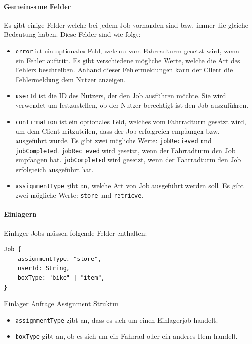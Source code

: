 \paragraph{Gemeinsame Felder}

Es gibt einige Felder welche bei jedem Job vorhanden sind bzw. immer die gleiche Bedeutung haben. Diese Felder sind wie folgt:

\begin{itemize}
  \item \texttt{error} ist ein optionales Feld, welches vom Fahrradturm gesetzt wird, wenn ein Fehler auftritt. Es gibt verschiedene mögliche Werte, welche die Art des Fehlers beschreiben. Anhand dieser Fehlermeldungen kann der Client die Fehlermeldung dem Nutzer anzeigen.
  \item \texttt{userId} ist die ID des Nutzers, der den Job ausführen möchte. Sie wird verwendet um festzustellen, ob der Nutzer berechtigt ist den Job auszuführen.
  \item \texttt{confirmation} ist ein optionales Feld, welches vom Fahrradturm gesetzt wird, um dem Client mitzuteilen, dass der Job erfolgreich empfangen bzw. ausgeführt wurde. Es gibt zwei mögliche Werte: \texttt{jobRecieved} und \texttt{jobCompleted}. \texttt{jobRecieved} wird gesetzt, wenn der Fahrradturm den Job empfangen hat. \texttt{jobCompleted} wird gesetzt, wenn der Fahrradturm den Job erfolgreich ausgeführt hat.
  \item \texttt{assignmentType} gibt an, welche Art von Job ausgeführt werden soll. Es gibt zwei mögliche Werte: \texttt{store} und \texttt{retrieve}.
\end{itemize}


\paragraph{Einlagern}

Einlager Jobs müssen folgende Felder enthalten:

\begin{listing}[H]
  \begin{verbatim}
Job {
    assignmentType: "store",
    userId: String,
    boxType: "bike" | "item",
}
\end{verbatim}
  \caption{Einlager Anfrage Assignment Struktur}
  \label{lst:einlager_assignment_struktur}
\end{listing}

\begin{itemize}
  \item \texttt{assignmentType} gibt an, dass es sich um einen Einlagerjob handelt.
  \item \texttt{boxType} gibt an, ob es sich um ein Fahrrad oder ein anderes Item handelt.
\end{itemize}

